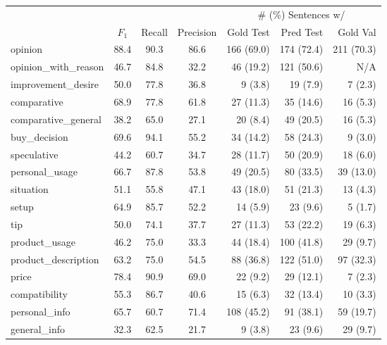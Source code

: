 \begin{table*}[t]
    \centering
    \begin{tabular}{lccc|rr|r}
        \toprule
        & & & & \multicolumn{3}{c}{\# (\%) Sentences w/ \taxtype{}} \\
        \taxtype{} & $F_1$ & Recall & Precision & Gold Test & Pred Test & Gold Val \\
        \midrule
        opinion               & 88.4 & 90.3  & 86.6 & 166 (69.0) & 174 (72.4) & 211 (70.3) \\
        opinion\_with\_reason & 46.7 & 84.8  & 32.2 & 46 (19.2)  & 121 (50.6) & N/A \\
        improvement\_desire   & 50.0 & 77.8  & 36.8 & 9 (3.8)    & 19 (7.9)   & 7 (2.3) \\
        comparative           & 68.9 & 77.8  & 61.8 & 27 (11.3)  & 35 (14.6)  & 16 (5.3) \\
        comparative\_general  & 38.2 & 65.0  & 27.1 & 20 (8.4)   & 49 (20.5)  & 16 (5.3) \\
        buy\_decision         & 69.6 & 94.1  & 55.2 & 34 (14.2)  & 58 (24.3)  & 9 (3.0) \\
        speculative           & 44.2 & 60.7  & 34.7 & 28 (11.7)  & 50 (20.9)  & 18 (6.0) \\
        personal\_usage       & 66.7 & 87.8  & 53.8 & 49 (20.5)  & 80 (33.5)  & 39 (13.0) \\
        situation             & 51.1 & 55.8  & 47.1 & 43 (18.0)  & 51 (21.3)  & 13 (4.3) \\
        setup                 & 64.9 & 85.7  & 52.2 & 14 (5.9)   & 23 (9.6)   & 5 (1.7) \\
        tip                   & 50.0 & 74.1  & 37.7 & 27 (11.3)  & 53 (22.2)  & 19 (6.3) \\
        product\_usage        & 46.2 & 75.0  & 33.3 & 44 (18.4)  & 100 (41.8) & 29 (9.7) \\
        product\_description  & 63.2 & 75.0  & 54.5 & 88 (36.8)  & 122 (51.0) & 97 (32.3) \\
        price                 & 78.4 & 90.9  & 69.0 & 22 (9.2)   & 29 (12.1)  & 7 (2.3) \\
        compatibility         & 55.3 & 86.7  & 40.6 & 15 (6.3)   & 32 (13.4)  & 10 (3.3) \\
        personal\_info        & 65.7 & 60.7  & 71.4 & 108 (45.2) & 91 (38.1)  & 59 (19.7) \\
        general\_info         & 32.3 & 62.5  & 21.7 & 9 (3.8)    & 23 (9.6)   & 29 (9.7) \\

\end{tabular}
\end{table*}
